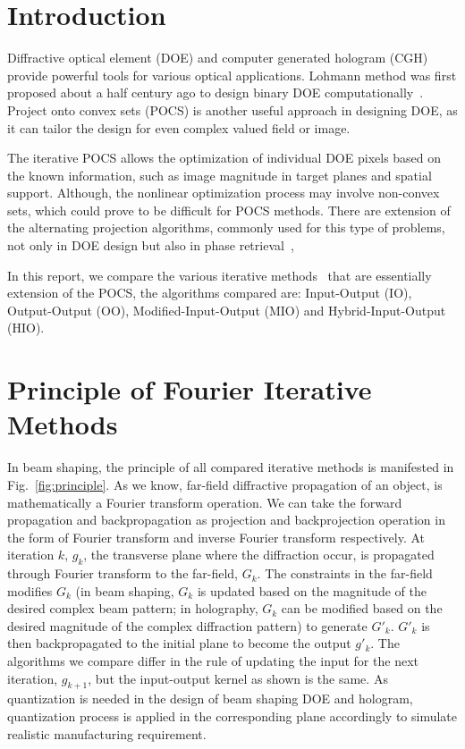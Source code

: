 \documentclass[letter,14pt]{extreport}
\begin{document}
\chapter{\Large Introduction}
\label{ch:intro}

Diffractive optical element (DOE) and computer generated hologram
(CGH) provide powerful tools for various
optical applications. Lohmann method was first proposed 
about a half century ago to design binary DOE 
computationally~\cite{Lohmann:1967in}. Project onto 
convex sets (POCS) is another useful approach in designing DOE,
as it can tailor the design for even complex valued field or image.

The iterative POCS allows the optimization of individual DOE pixels 
based on the known information, such as image magnitude in
target planes and spatial support. Although, the nonlinear
optimization process may involve non-convex sets, which could
prove to be difficult for POCS methods. There are extension
of the alternating projection algorithms, commonly used for this
type of problems, not only in DOE design but also in phase 
retrieval~\cite{Fienup3},

In this report, we compare the various iterative 
methods~\cite{Fienup:1980ge,Wyrowski:1988hn,Chang:1994wt,Ripoll:2004ix}
that are essentially extension of the POCS, the algorithms compared are: 
Input-Output (IO), Output-Output (OO), 
Modified-Input-Output (MIO) and Hybrid-Input-Output (HIO).

\chapter{\Large Principle of Fourier Iterative Methods}
\label{ch:principle}

In beam shaping, the principle of all compared iterative methods
is manifested in Fig.~\ref{fig:principle}.
As we know, far-field diffractive propagation of an object,
is mathematically a Fourier transform operation. We can take
the forward propagation and backpropagation as projection
and backprojection operation in the form of Fourier transform
and inverse Fourier transform respectively. At iteration
$k$, $g_k$, the transverse plane where the diffraction occur, is propagated
through Fourier transform to the far-field, $G_k$. The constraints
in the far-field modifies $G_k$ (in beam shaping, $G_k$ is updated
based on the magnitude of the desired complex beam pattern; 
in holography, $G_k$ can be modified based on the desired magnitude of 
the complex diffraction pattern) to generate $G'_{k}$. 
$G'_{k}$ is then backpropagated to the initial
plane to become the output $g'_{k}$. The algorithms we compare
differ in the rule of updating the input for the next iteration, $g_{k+1}$,
but the input-output kernel as shown is the same. As quantization
is needed in the design of beam shaping DOE and hologram, quantization
process is applied in the corresponding plane accordingly to
simulate realistic manufacturing requirement.
\end{document}
